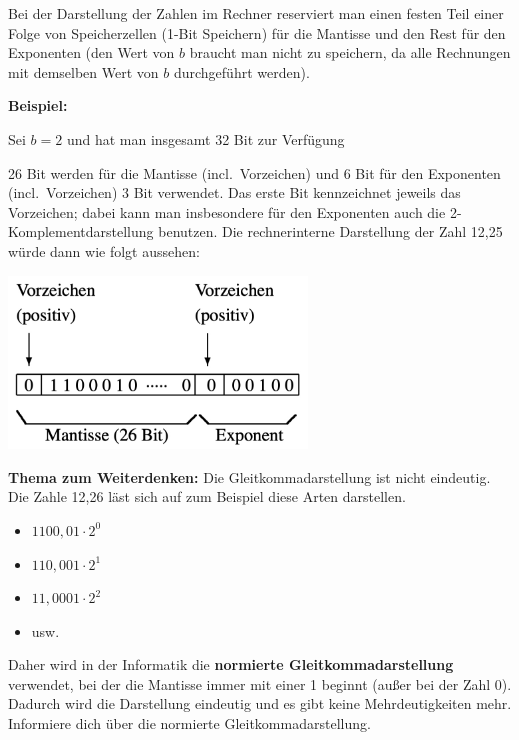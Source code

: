 \documentclass[
  11pt,
  a4paper,
  DIV=11,
  numbers=noendperiod]{scrartcl}
\providecommand{\tightlist}{%
  \setlength{\itemsep}{0pt}\setlength{\parskip}{0pt}}\usepackage{longtable,booktabs,array}
\begin{document}
Bei der Darstellung der Zahlen im Rechner reserviert man einen festen
Teil einer Folge von Speicherzellen (1-Bit Speichern) für die Mantisse
und den Rest für den Exponenten (den Wert von \(b\) braucht man nicht zu
speichern, da alle Rechnungen mit demselben Wert von \(b\) durchgeführt
werden).

\textbf{Beispiel:}

Sei \(b = 2\) und hat man insgesamt 32 Bit zur Verfügung

26 Bit werden für die Mantisse (incl.~Vorzeichen) und 6 Bit für den
Exponenten (incl.~Vorzeichen) 3 Bit verwendet. Das erste Bit
kennzeichnet jeweils das Vorzeichen; dabei kann man insbesondere für den
Exponenten auch die 2-Komplementdarstellung benutzen. Die rechnerinterne
Darstellung der Zahl 12,25 würde dann wie folgt aussehen:

\includegraphics[width=3.125in,height=\textheight,keepaspectratio]{images/beispiel.jpg}

\textbf{Thema zum Weiterdenken:} Die Gleitkommadarstellung ist nicht
eindeutig. Die Zahle 12,26 läst sich auf zum Beispiel diese Arten
darstellen.

\begin{itemize}
\tightlist
\item
  \(1100,01\cdot 2^0\)
\item
  \(110,001\cdot 2^1\)
\item
  \(11,0001\cdot 2^2\)
\item
  usw.
\end{itemize}

Daher wird in der Informatik die \textbf{normierte
Gleitkommadarstellung} verwendet, bei der die Mantisse immer mit einer 1
beginnt (außer bei der Zahl 0). Dadurch wird die Darstellung eindeutig
und es gibt keine Mehrdeutigkeiten mehr. Informiere dich über die
normierte Gleitkommadarstellung.
\end{document}
